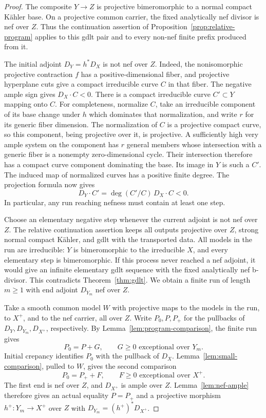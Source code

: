 \begin{proof}
The composite \(Y\to Z\) is projective bimeromorphic to a normal compact
K\"ahler base.  On a projective common carrier, the fixed analytically nef
divisor is nef over \(Z\).  Thus the continuation assertion of
Proposition~\ref{prop:relative-program} applies to this gdlt pair and to
every non-nef finite prefix produced from it.

The initial adjoint \(D_Y=h^*D_X\) is not nef over \(Z\).  Indeed, the
nonisomorphic projective contraction \(f\) has a positive-dimensional
fiber, and projective hyperplane cuts give a compact irreducible curve
\(C\) in that fiber.  The negative ample sign gives \(D_X\cdot C<0\).
There is a compact irreducible curve \(C'\subset Y\) mapping onto \(C\).
For completeness, normalize \(C\), take an irreducible component of its
base change under \(h\) which dominates that normalization, and write
\(r\) for its generic fiber dimension.  The normalization of \(C\) is a
projective compact curve, so this component, being projective over it, is
projective.  A sufficiently high very ample system on the component has
\(r\) general members whose intersection with a generic fiber is a
nonempty zero-dimensional cycle.  Their intersection therefore has a
compact curve component dominating the base.  Its image in \(Y\) is such
a \(C'\).  The induced map of normalized curves has a positive finite
degree.  The projection formula now gives
\[
 D_Y\cdot C'=\deg(C'/C)\,D_X\cdot C<0.
\]
In particular, any run reaching nefness must contain at least one step.

Choose an elementary negative step whenever the current adjoint is not
nef over \(Z\).  The relative continuation assertion keeps all outputs
projective over \(Z\), strong normal compact K\"ahler, and gdlt with the
transported data.  All models in the run are irreducible: \(Y\) is
bimeromorphic to the irreducible \(X\), and every elementary step is
bimeromorphic.  If this process never reached a nef adjoint, it would
give an infinite elementary gdlt sequence with the fixed analytically nef
b-divisor.  This contradicts Theorem~\ref{thm:gdlt}.  We obtain a finite
run of length \(m\geq1\) with end adjoint \(D_{Y_m}\) nef over \(Z\).

Take a smooth common model \(W\) with projective maps to the models in the
run, to \(X^+\), and to the nef carrier, all over \(Z\).  Write \(P_0,P,P_+\) for the pullbacks
of \(D_Y,D_{Y_m},D_{X^+}\), respectively.  By
Lemma~\ref{lem:program-comparison}, the finite run gives
\[
 P_0=P+G,\qquad G\geq0\text{ exceptional over }Y_m.
\]
Initial crepancy identifies \(P_0\) with the pullback of \(D_X\).
Lemma~\ref{lem:small-comparison}, pulled to \(W\), gives the second
comparison
\[
 P_0=P_++F,\qquad F\geq0\text{ exceptional over }X^+.
\]
The first end is nef over \(Z\), and \(D_{X^+}\) is ample over \(Z\).
Lemma~\ref{lem:nef-ample} therefore gives an actual equality \(P=P_+\)
and a projective morphism \(h^+:Y_m\to X^+\) over \(Z\) with
\(D_{Y_m}=(h^+)^*D_{X^+}\).


\end{proof}
